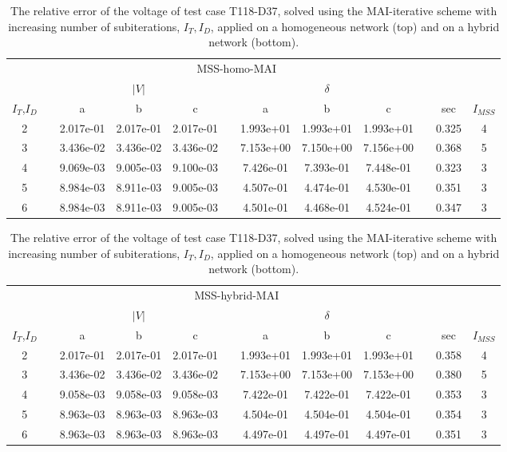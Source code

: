 \begin{table}[h]
\renewcommand{\arraystretch}{1.3}
\centering
\caption{The relative error of the voltage of test case T118-D37, solved using the MAI-iterative scheme with increasing number of subiterations, $I_T, I_D$, applied on a homogeneous network (top) and on a hybrid network (bottom).}\label{tab:MAIschemes}
\begin{adjustbox}{width=1\textwidth} %
\small
\begin{tabular}{cccccccccccc}
\toprule
{} && \multicolumn{7}{c}{MSS-homo-MAI} && &  \\
\cmidrule{3-9}
{} && \multicolumn{3}{c}{$|V|$} && \multicolumn{3}{c}{$\delta$} && \\
\cmidrule{3-5}\cmidrule{7-9}
{$I_T$,$I_D$} &&        a &        b &       c &&        a &       b &        c && sec & $I_{MSS}$\\
\midrule
2 &&  2.017e-01 &  2.017e-01 &  2.017e-01 &&  1.993e+01 &  1.993e+01 &  1.993e+01 && 0.325 & 4 \\
3 &&  3.436e-02 &  3.436e-02 &  3.436e-02 &&  7.153e+00 &  7.150e+00 &  7.156e+00 && 0.368 & 5 \\
4 &&  9.069e-03 &  9.005e-03 &  9.100e-03 &&  7.426e-01 &  7.393e-01 &  7.448e-01 && 0.323 & 3\\
5 &&  8.984e-03 &  8.911e-03 &  9.005e-03 &&  4.507e-01 &  4.474e-01 &  4.530e-01 && 0.351 & 3\\
6 &&  8.984e-03 &  8.911e-03 &  9.005e-03 &&  4.501e-01 &  4.468e-01 &  4.524e-01 && 0.347 & 3\\
\bottomrule
\end{tabular}
\end{adjustbox}
\begin{adjustbox}{width=1\textwidth} %
\small
\begin{tabular}{cccccccccccc}
\toprule
{} && \multicolumn{7}{c}{MSS-hybrid-MAI} && &  \\
\cmidrule{3-9}
{} && \multicolumn{3}{c}{$|V|$} && \multicolumn{3}{c}{$\delta$} && \\
\cmidrule{3-5}\cmidrule{7-9}
{$I_T$,$I_D$} &&        a &        b &       c &&        a &       b &        c && sec & $I_{MSS}$\\
\midrule
2 &&  2.017e-01 &  2.017e-01 &  2.017e-01 &&  1.993e+01 &  1.993e+01 &  1.993e+01 && 0.358 & 4 \\
3 &&  3.436e-02 &  3.436e-02 &  3.436e-02 &&  7.153e+00 &  7.153e+00 &  7.153e+00 && 0.380& 5\\
4 &&  9.058e-03 &  9.058e-03 &  9.058e-03 &&  7.422e-01 &  7.422e-01 &  7.422e-01 && 0.353& 3\\
5 &&  8.963e-03 &  8.963e-03 &  8.963e-03 &&  4.504e-01 &  4.504e-01 &  4.504e-01 && 0.354& 3 \\
6 &&  8.963e-03 &  8.963e-03 &  8.963e-03 &&  4.497e-01 &  4.497e-01 &  4.497e-01 && 0.351&3\\
\bottomrule
\end{tabular}
\end{adjustbox}

\end{table}
